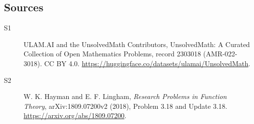 \documentclass[11pt]{article}
\begin{document}
\subsection{Sources}
\begin{description}
\item[\hypertarget{source:2303018:1}{S1}] ULAM.AI and the UnsolvedMath Contributors, UnsolvedMath: A Curated Collection of Open Mathematics Problems, record 2303018 (AMR-022-3018). CC BY 4.0. \url{https://huggingface.co/datasets/ulamai/UnsolvedMath}.
\item[\hypertarget{source:2303018:2}{S2}] W. K. Hayman and E. F. Lingham, \emph{Research Problems in Function Theory}, arXiv:1809.07200v2 (2018), Problem 3.18 and Update 3.18. \url{https://arxiv.org/abs/1809.07200}.
\end{description}
\label{end:2303018}
\end{document}
